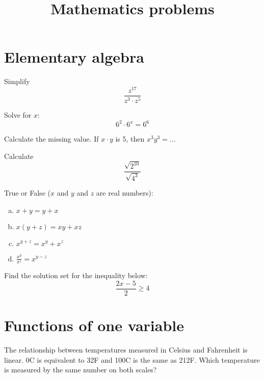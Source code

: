 \documentclass[10pt]{article}
\newenvironment{problem}[2][Problem]{\begin{trivlist}
\item[\hskip \labelsep {\bfseries #1}\hskip \labelsep {\bfseries #2.}]}{\end{trivlist}}
\begin{document}
 
\title{Mathematics problems}
\date{}
\maketitle

 \section{Elementary algebra}
 
\begin{problem}{1.1}
Simplify $$\frac{z^{17}}{z^3 \cdot z^5}$$
\end{problem}

\begin{problem}{1.2}
Solve for $x$:
$$6^2 \cdot 6^x = 6^6$$
\end{problem}

\begin{problem}{1.3}
Calculate the missing value. If $x \cdot y$ is 5, then $x^3y^3=\dots$
\end{problem}

\begin{problem}{1.4}
Calculate
$$\frac{\sqrt{2^{10}}}{\sqrt{4^3}}$$
\end{problem}

\begin{problem}{1.5}
True or False ($x$ and $y$ and $z$ are real numbers):
\begin{enumerate}[(a)]
    \item $x+y=y+x$
    \item $x(y+z)=xy+xz$
    \item $x^{y+z}=x^y+x^z$
    \item $\frac{x^y}{x^z}=x^{y-z}$
\end{enumerate}
\end{problem}

\begin{problem}{1.6}
Find the solution set for the inequality below:
$$\frac{2x-5}{2}\ge4$$
\end{problem}

\section{Functions of one variable}

\begin{problem}{2.1 (Based on SYD 2.5.6)}
The relationship between temperatures measured in Celsius and Fahrenheit is linear. 0\degree C is equivalent to 32\degree F and 100\degree C is the same as 212\degree F.
 Which temperature is measured by the same number on both scales?
\end{problem}
\end{document}
